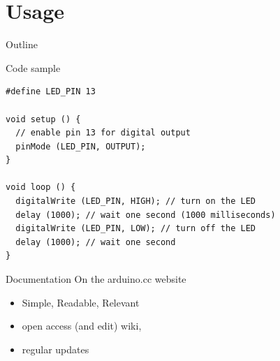 \section{Usage}

\begin{frame}{Outline}
    \tableofcontents [current]
\end{frame}

\begin{frame}[containsverbatim] {Code sample}
\begin{Verbatim}[fontsize=\small]
#define LED_PIN 13

void setup () {
  // enable pin 13 for digital output
  pinMode (LED_PIN, OUTPUT);
}

void loop () {
  digitalWrite (LED_PIN, HIGH); // turn on the LED
  delay (1000); // wait one second (1000 milliseconds)
  digitalWrite (LED_PIN, LOW); // turn off the LED
  delay (1000); // wait one second
}
\end{Verbatim}
\end {frame}



\begin{frame} {Documentation}
	On the arduino.cc website
	\begin{itemize}
		\item Simple, Readable, Relevant 
		\item open access (and edit) wiki, 
		\item regular updates
	\end{itemize}
\end{frame}

